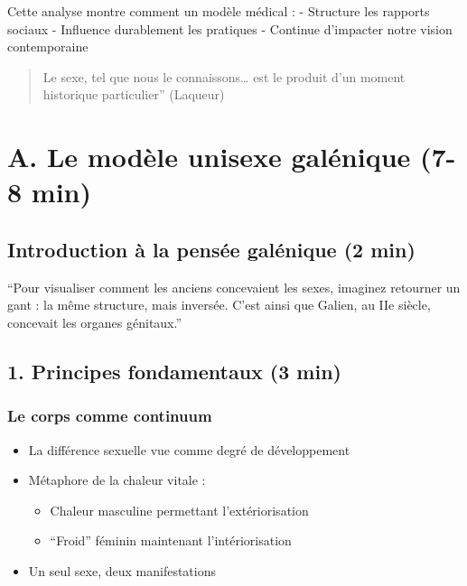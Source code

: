 \documentclass[
  letterpaper,
  DIV=11,
  numbers=noendperiod]{scrreprt}
\providecommand{\tightlist}{%
  \setlength{\itemsep}{0pt}\setlength{\parskip}{0pt}}\usepackage{longtable,booktabs,array}
\begin{document}
Cette analyse montre comment un modèle médical : - Structure les
rapports sociaux - Influence durablement les pratiques - Continue
d'impacter notre vision contemporaine

\begin{quote}
Le sexe, tel que nous le connaissons\ldots{} est le produit d'un moment
historique particulier'' (Laqueur)
\end{quote}

\subsection{}\label{section-4}


\chapter{A. Le modèle unisexe galénique (7-8
min)}\label{a.-le-moduxe8le-unisexe-galuxe9nique-7-8-min}

\section{Introduction à la pensée galénique (2
min)}\label{introduction-uxe0-la-pensuxe9e-galuxe9nique-2-min}

``Pour visualiser comment les anciens concevaient les sexes, imaginez
retourner un gant : la même structure, mais inversée. C'est ainsi que
Galien, au IIe siècle, concevait les organes génitaux.''

\section{1. Principes fondamentaux (3
min)}\label{principes-fondamentaux-3-min}

\subsection{Le corps comme continuum}\label{le-corps-comme-continuum}

\begin{itemize}
\tightlist
\item
  La différence sexuelle vue comme degré de développement
\item
  Métaphore de la chaleur vitale :

  \begin{itemize}
  \tightlist
  \item
    Chaleur masculine permettant l'extériorisation
  \item
    ``Froid'' féminin maintenant l'intériorisation
  \end{itemize}
\item
  Un seul sexe, deux manifestations
\end{itemize}
\end{document}
